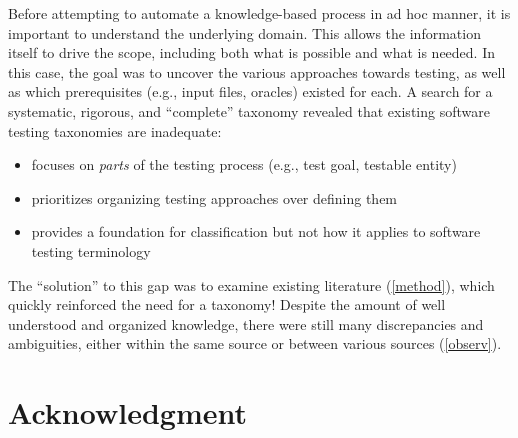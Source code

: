 \documentclass[conference]{IEEEtran}
\begin{document}
Before attempting to automate a knowledge-based process in ad hoc manner, it is
important to understand the underlying domain. This allows the information
itself to drive the scope, including both what is possible and what is needed.
In this case, the goal was to uncover the various approaches towards testing,
as well as which prerequisites (e.g., input files, oracles) existed for each.
A search for a systematic, rigorous, and ``complete'' taxonomy revealed that
existing software testing taxonomies are inadequate:

\begin{itemize}
    \item \cite{TebesEtAl2020a} focuses on \emph{parts} of the
          testing process (e.g., test goal, testable entity)
    \item \cite{SouzaEtAl2017} prioritizes organizing testing
          approaches over defining them
    \item \cite{UnterkalmsteinerEtAl2014} provides a foundation for
          classification but not how it applies to software testing terminology
\end{itemize}

The ``solution'' to this gap was to examine existing literature (\ref{method}),
which quickly reinforced the need for a taxonomy! Despite the amount of
well understood and organized knowledge, there were still many discrepancies
and ambiguities, either within the same source or between various sources
(\ref{observ}).




\section*{Acknowledgment}


\newpage



\end{document}
